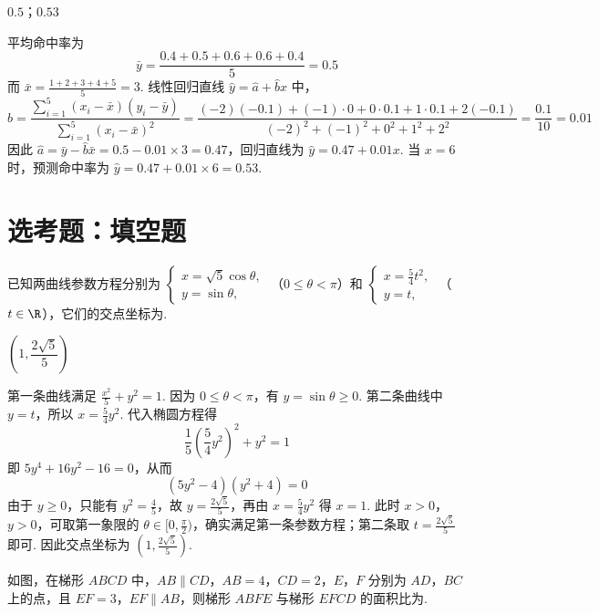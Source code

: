 \begin{answer}
\(0.5\)；\(0.53\)
\end{answer}

\begin{solution}
平均命中率为
\[
\bar y=\frac{0.4+0.5+0.6+0.6+0.4}{5}=0.5
\]
而 \(\bar x=\frac{1+2+3+4+5}{5}=3\). 线性回归直线 \(\hat y=\hat a+\hat b x\) 中，
\[
\hat b=\frac{\sum_{i=1}^{5}(x_i-\bar x)(y_i-\bar y)}{\sum_{i=1}^{5}(x_i-\bar x)^2}
 =\frac{(-2)(-0.1)+(-1)\cdot0+0\cdot0.1+1\cdot0.1+2(-0.1)}{(-2)^2+(-1)^2+0^2+1^2+2^2}
 =\frac{0.1}{10}=0.01
\]
因此 \(\hat a=\bar y-\hat b\bar x=0.5-0.01\times3=0.47\)，回归直线为 \(\hat y=0.47+0.01x\). 当 \(x=6\) 时，预测命中率为 \(\hat y=0.47+0.01\times6=0.53\).
\end{solution}

\section{选考题：填空题}

\begin{problem}
已知两曲线参数方程分别为 \(\begin{cases}
x = \sqrt{5} \cos \theta,\\
y = \sin \theta,
\end{cases}\) （\(0 \leqslant \theta < \pi\)）和 \(\begin{cases}
x = \frac{5}{4} t^2,\\
y = t,
\end{cases}\) （\(t \in \R\)），它们的交点坐标为\fillinblank{}.
\end{problem}

\begin{answer}
\(\left(1,\dfrac{2\sqrt{5}}{5}\right)\)
\end{answer}

\begin{solution}
第一条曲线满足 \(\frac{x^2}{5}+y^2=1\). 因为 \(0\leqslant\theta<\pi\)，有 \(y=\sin\theta\geqslant0\). 第二条曲线中 \(y=t\)，所以 \(x=\frac{5}{4}y^2\). 代入椭圆方程得
\[
\frac{1}{5}\left(\frac{5}{4}y^2\right)^2+y^2=1
\]
即 \(5y^4+16y^2-16=0\)，从而
\[
(5y^2-4)(y^2+4)=0
\]
由于 \(y\geqslant0\)，只能有 \(y^2=\frac45\)，故 \(y=\frac{2\sqrt5}{5}\)，再由 \(x=\frac54y^2\) 得 \(x=1\). 此时 \(x>0\)，\(y>0\)，可取第一象限的 \(\theta\in[0,\frac\pi2)\)，确实满足第一条参数方程；第二条取 \(t=\frac{2\sqrt5}{5}\) 即可. 因此交点坐标为 \(\left(1,\frac{2\sqrt5}{5}\right)\).
\end{solution}

\begin{problem}
如图，在梯形 \(ABCD\) 中，\(AB \parallel CD\)，\(AB = 4\)，\(CD = 2\)，\(E\)，\(F\) 分别为 \(AD\)，\(BC\) 上的点，且 \(EF = 3\)，\(EF \parallel AB\)，则梯形 \(ABFE\) 与梯形 \(EFCD\) 的面积比为\fillinblank{}.

\end{problem}

